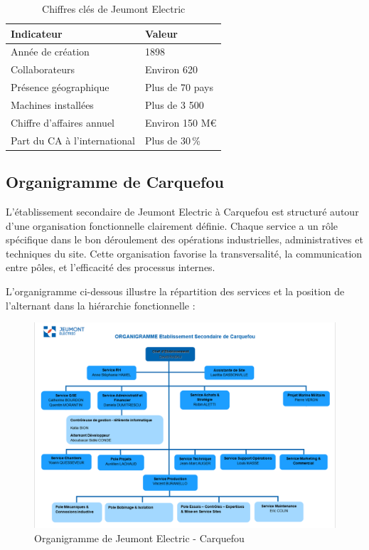 \documentclass[11pt,a4paper]{article}
\begin{document}
\begin{table}[H]
\centering
\begin{tabular}{|p{8cm}|p{5cm}|}
	\hline
	\textbf{Indicateur} & \textbf{Valeur} \\ \hline
	Année de création & 1898 \\ \hline
	Collaborateurs & Environ 620 \\ \hline
	Présence géographique & Plus de 70 pays \\ \hline
	Machines installées & Plus de 3 500 \\ \hline
	Chiffre d'affaires annuel & Environ 150 M€ \\ \hline
	Part du CA à l'international & Plus de 30\,\% \\ \hline
\end{tabular}
\caption{Chiffres clés de Jeumont Electric}
\end{table}


\subsection{Organigramme de Carquefou}
L’établissement secondaire de Jeumont Electric à Carquefou est structuré autour d’une organisation fonctionnelle clairement définie. Chaque service a un rôle spécifique dans le bon déroulement des opérations industrielles, administratives et techniques du site. Cette organisation favorise la transversalité, la communication entre pôles, et l'efficacité des processus internes.

L’organigramme ci-dessous illustre la répartition des services et la position de l’alternant dans la hiérarchie fonctionnelle :

\begin{figure}[H]
    \centering
    \includegraphics[width=\textwidth]{../Images/organigramme.png}
    \caption{Organigramme de Jeumont Electric - Carquefou}
\end{figure}
\end{document}
